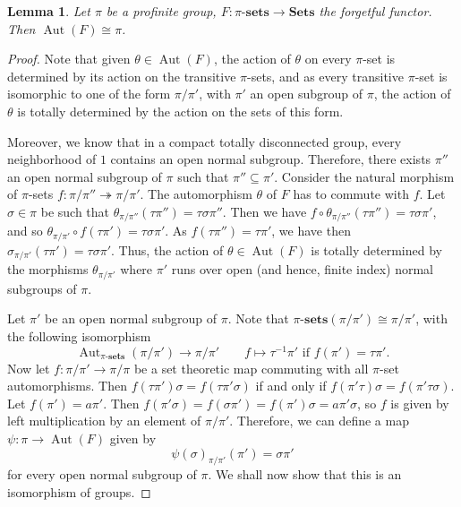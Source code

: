 \documentclass[10pt]{article}
\theoremstyle{thmstyle}
\newtheorem{lemma}[theorem]{Lemma}
\theoremstyle{defstyle}
\newcommand{\catSets}{\mathbf{Sets}}
\newcommand{\sets}[1]{#1\text{-}\mathbf{sets}}
\newcommand{\Aut}{\operatorname{Aut}}
\newcommand{\onto}{\twoheadrightarrow}
\begin{document}
\begin{lemma}
    Let $\pi$ be a profinite group, $F:\sets{\pi}\to\catSets$ the forgetful functor. Then $\Aut(F)\cong\pi$.
\end{lemma}
\begin{proof}
    Note that given $\theta\in\Aut(F)$, the action of $\theta$ on every $\pi$-set is determined by its action on the transitive $\pi$-sets, and as every transitive $\pi$-set is isomorphic to one of the form $\pi/\pi'$, with $\pi'$ an open subgroup of $\pi$, the action of $\theta$ is totally determined by the action on the sets of this form. 

    Moreover, we know that in a compact totally disconnected group, every neighborhood of $1$ contains an open normal subgroup. Therefore, there exists $\pi''$ an open normal subgroup of $\pi$ such that $\pi''\subseteq\pi'$. Consider the natural morphism of $\pi$-sets $f: \pi/\pi''\onto\pi/\pi'$. The automorphism $\theta$ of $F$ has to commute with $f$. Let $\sigma\in\pi$ be such that $\theta_{\pi/\pi''}(\tau\pi'') = \tau\sigma\pi''$. Then we have $f\circ\theta_{\pi/\pi''}(\tau\pi'') = \tau\sigma\pi'$, and so $\theta_{\pi/\pi'}\circ f(\tau\pi') = \tau\sigma\pi'$. As $f(\tau\pi'') = \tau\pi'$, we have then $\sigma_{\pi/\pi'}(\tau\pi') = \tau\sigma\pi'$. Thus, the action of $\theta\in\Aut(F)$ is totally determined by the morphisms $\theta_{\pi/\pi'}$ where $\pi'$ runs over open (and hence, finite index) normal subgroups of $\pi$.

    Let $\pi'$ be an open normal subgroup of $\pi$. Note that $\sets{\pi}(\pi/\pi')\cong\pi/\pi'$, with the following isomorphism 
    \begin{equation*}
        \Aut_{\sets{\pi}}(\pi/\pi')\to\pi/\pi'\qquad f\mapsto\tau^{-1}\pi'\text{ if } f(\pi') = \tau\pi'.
    \end{equation*}
    Now let $f:\pi/\pi'\to\pi/\pi$ be a set theoretic map commuting with all $\pi$-set automorphisms. Then $f(\tau\pi')\sigma = f(\tau\pi'\sigma)$ if and only if $f(\pi'\tau)\sigma = f(\pi'\tau\sigma)$. Let $f(\pi') = a\pi'$. Then $f(\pi'\sigma) = f(\sigma\pi') = f(\pi')\sigma = a\pi'\sigma$, so $f$ is given by left multiplication by an element of $\pi/\pi'$. Therefore, we can define a map $\psi: \pi\to\Aut(F)$ given by 
    \begin{equation*}
        \psi(\sigma)_{\pi/\pi'}(\pi') = \sigma\pi'
    \end{equation*}
    for every open normal subgroup of $\pi$. We shall now show that this is an isomorphism of groups.


\end{proof}
\end{document}
